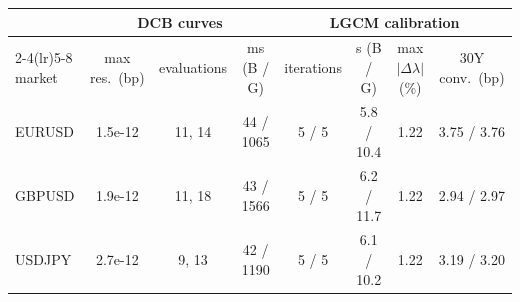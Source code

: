\begin{tabular}{lccccccc}
\toprule
 & \multicolumn{3}{c}{DCB curves} & \multicolumn{4}{c}{LGCM calibration} \\
\cmidrule(lr){2-4}\cmidrule(lr){5-8}
market & max res.\ (bp) & evaluations & ms (B / G) & iterations & s (B / G) & max $|\Delta\lambda|$ (\%) & 30Y conv.\ (bp) \\
\midrule
EURUSD & 1.5e-12 & 11, 14 & 44 / 1065 & 5 / 5 & 5.8 / 10.4 & 1.22 & 3.75 / 3.76 \\
GBPUSD & 1.9e-12 & 11, 18 & 43 / 1566 & 5 / 5 & 6.2 / 11.7 & 1.22 & 2.94 / 2.97 \\
USDJPY & 2.7e-12 & 9, 13 & 42 / 1190 & 5 / 5 & 6.1 / 10.2 & 1.22 & 3.19 / 3.20 \\
\bottomrule
\end{tabular}